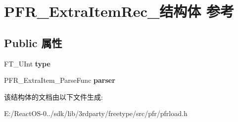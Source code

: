 \hypertarget{struct_p_f_r___extra_item_rec__}{}\section{P\+F\+R\+\_\+\+Extra\+Item\+Rec\+\_\+结构体 参考}
\label{struct_p_f_r___extra_item_rec__}
\subsection*{Public 属性}
\begin{DoxyCompactItemize}
\item 
\mbox{\label{struct_p_f_r___extra_item_rec___ab29a98311f1f7c16c73083212301f470}} 
F\+T\+\_\+\+U\+Int {\bfseries type}
\item 
\mbox{\label{struct_p_f_r___extra_item_rec___ac9e55eddd23a1ab1ec63fd6e2b3c950b}} 
P\+F\+R\+\_\+\+Extra\+Item\+\_\+\+Parse\+Func {\bfseries parser}
\end{DoxyCompactItemize}


该结构体的文档由以下文件生成\+:\begin{DoxyCompactItemize}
\item 
E\+:/\+React\+O\+S-\/0../sdk/lib/3rdparty/freetype/src/pfr/pfrload.\+h\end{DoxyCompactItemize}
